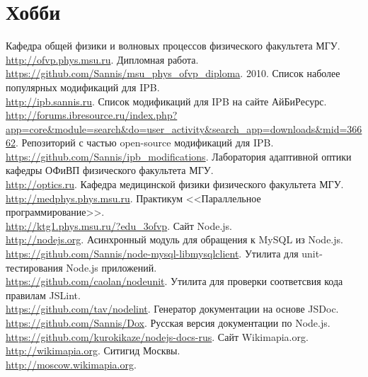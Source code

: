 \documentclass[11pt,a4paper]{moderncv}
\begin{document}
\section{Хобби}
\cvline{}{\small }


\renewcommand\refname{Ссылки}

\begin{thebibliography}{99}
    Кафедра общей физики и волновых процессов физического факультета МГУ.\\
    \url{http://ofvp.phys.msu.ru}.
    Дипломная работа.\\
    \url{https://github.com/Sannis/msu_phys_ofvp_diploma}.
    2010.
    Список наболее популярных модификаций для IPB.\\
    \url{http://ipb.sannis.ru}.
    Список модификаций для IPB на сайте АйБиРесурс.\\
    \url{http://forums.ibresource.ru/index.php?app=core&module=search&do=user_activity&search_app=downloads&mid=36662}.
    Репозиторий с частью open-source модификаций для IPB.\\
    \url{https://github.com/Sannis/ipb_modifications}.
    Лаборатория адаптивной оптики кафедры ОФиВП физического факультета МГУ.\\
    \url{http://optics.ru}.
    Кафедра медицинской физики физического факультета МГУ.\\
    \url{http://medphys.phys.msu.ru}.
    Практикум <<Параллельное программирование>>.\\
    \url{http://ktg1.phys.msu.ru/?edu_3ofvp}.
    Сайт Node.js.\\
    \url{http://nodejs.org}.
    Асинхронный модуль для обращения к MySQL из Node.js.\\
    \url{https://github.com/Sannis/node-mysql-libmysqlclient}.
    Утилита для unit-тестирования Node.js приложений.\\
    \url{https://github.com/caolan/nodeunit}.
    Утилита для проверки соответсвия кода правилам JSLint.\\
    \url{https://github.com/tav/nodelint}.
    Генератор документации на основе JSDoc.\\
    \url{https://github.com/Sannis/Dox}.
    Русская версия документации по Node.js.\\
    \url{https://github.com/kurokikaze/nodejs-docs-rus}.
    Сайт Wikimapia.org.\\
    \url{http://wikimapia.org}.
    Ситигид Москвы.\\
    \url{http://moscow.wikimapia.org}.
\end{thebibliography}
\end{document}
